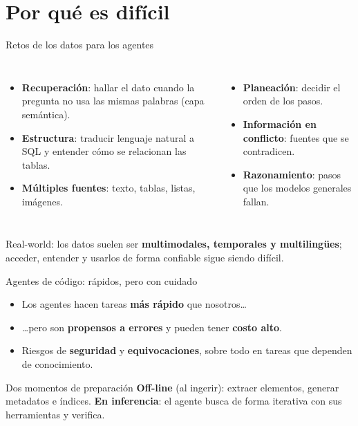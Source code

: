 \documentclass[aspectratio=169]{beamer}
\begin{document}
\section{Por qu\'e es dif\'icil}

\begin{frame}{Retos de los datos para los agentes}
  \begin{columns}[t]
      \begin{itemize}
        \item \textbf{Recuperaci\'on}: hallar el dato cuando la pregunta no usa
              las mismas palabras (capa sem\'antica).
        \item \textbf{Estructura}: traducir lenguaje natural a SQL y entender
              c\'omo se relacionan las tablas.
        \item \textbf{M\'ultiples fuentes}: texto, tablas, listas, im\'agenes.
      \end{itemize}
      \begin{itemize}
        \item \textbf{Planeaci\'on}: decidir el orden de los pasos.
        \item \textbf{Informaci\'on en conflicto}: fuentes que se contradicen.
        \item \textbf{Razonamiento}: pasos que los modelos generales fallan.
      \end{itemize}
  \end{columns}
  \vspace{0.4em}
  Real-world: los datos suelen ser \textbf{multimodales, temporales y
  multiling\"ues}; acceder, entender y usarlos de forma confiable sigue siendo
  dif\'icil.
\end{frame}

\begin{frame}{Agentes de c\'odigo: r\'apidos, pero con cuidado}
  \begin{itemize}
    \item Los agentes hacen tareas \textbf{m\'as r\'apido} que nosotros\ldots
    \item \ldots pero son \textbf{propensos a errores} y pueden tener
          \textbf{costo alto}.
    \item Riesgos de \textbf{seguridad} y \textbf{equivocaciones}, sobre todo en
          tareas que dependen de conocimiento.
  \end{itemize}
  \begin{block}{Dos momentos de preparaci\'on}
    \textbf{Off-line} (al ingerir): extraer elementos, generar metadatos e
    \'indices. \textbf{En inferencia}: el agente busca de forma iterativa con
    sus herramientas y verifica.
  \end{block}
\end{frame}
\end{document}
